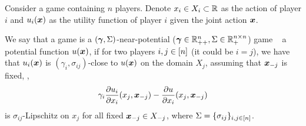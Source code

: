 \begin{definition}
\label{def:near-potential}
    Consider a game containing $n$ players. Denote $x_i \in X_i \subset \mathbb{R}$ as the action of player $i$ and $u_i({\bm{x}})$ as the utility function of player $i$ given the joint action ${\bm{x}}$. 

    We say that a game is a $(\bm{\gamma},\Sigma)$-near-potential ($\bm{\gamma} \in \mathbb{R}_{++}^n, \Sigma\in\mathbb{R}_+^{n\times n}$) game \wrt~  a potential function $u({\bm{x}})$, if for two players ${i,j\in[n]}$ (it could be $i = j$), we have that $u_i({\bm{x}})$ is $(\gamma_i, \sigma_{ij})$-close to $u({\bm{x}})$ on the domain $X_j$, assuming that ${\bm{x}}_{-j}$ is fixed, \ie, 
    \begin{align*}
        \gamma_i \frac{\partial u_i}{\partial x_i}(x_j,{\bm{x}}_{-j}) - \frac{\partial u}{\partial x_i}(x_j,{\bm{x}}_{-j})
    \end{align*}
    is $\sigma_{ij}$-Lipschitz on $x_j$ for all fixed ${\bm{x}}_{-j}\in X_{-j}$, where $\Sigma = \{\sigma_{ij}\}_{i,j\in[n]}$.
\end{definition}